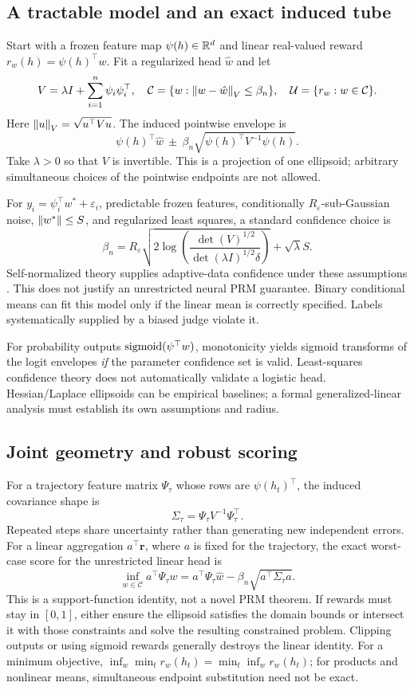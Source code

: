 \subsection{A tractable model and an exact induced tube}
Start with a frozen feature map $\psi(h)\in\mathbb{R}^d$ and linear real-valued reward
$r_w(h)=\psi(h)^\top w$. Fit a regularized head $\hat w$ and let
\[
 V=\lambda I+\sum_{i=1}^n\psi_i\psi_i^\top,
 \quad \mathcal C=\{w:\left\lVert w-\hat w\right\rVert_V\le\beta_n\},
 \quad \mathcal{U}=\{r_w:w\in\mathcal C\}.
\]
Here $\left\lVert u\right\rVert_V=\sqrt{u^\top Vu}$. The induced pointwise envelope is
\[
 \psi(h)^\top\hat w\ \pm\ \beta_n\sqrt{\psi(h)^\top V^{-1}\psi(h)}.
\]
Take $\lambda>0$ so that $V$ is invertible. This is a projection of one ellipsoid;
arbitrary simultaneous choices of the
pointwise endpoints are not allowed.

For $y_i=\psi_i^\top w^*+\varepsilon_i$, predictable frozen features,
conditionally $R_\varepsilon$-sub-Gaussian noise, $\left\lVert w^*\right\rVert\le S$, and
regularized least squares, a standard confidence choice is
\[
 \beta_n=R_\varepsilon\sqrt{2\log\left(
 \frac{\det(V)^{1/2}}{\det(\lambda I)^{1/2}\delta}\right)}+\sqrt\lambda S.
\]
Self-normalized theory supplies adaptive-data confidence under these assumptions
\cite{abbasi}. This does not justify an unrestricted neural PRM guarantee.
Binary conditional means can fit this model only if the linear mean is correctly
specified. Labels systematically supplied by a biased judge violate it.

For probability outputs $\operatorname{sigmoid}(\psi^\top w)$, monotonicity yields sigmoid
transforms of the logit envelopes \emph{if} the parameter confidence set is
valid. Least-squares confidence theory does not automatically validate a
logistic head. Hessian/Laplace ellipsoids can be empirical baselines; a formal
generalized-linear analysis must establish its own assumptions and radius.

\subsection{Joint geometry and robust scoring}
For a trajectory feature matrix $\Psi_\tau$ whose rows are $\psi(h_t)^\top$,
the induced covariance shape is
\[
 \Sigma_\tau=\Psi_\tau V^{-1}\Psi_\tau^\top.
\]
Repeated steps share uncertainty rather than generating new independent errors.
For a linear aggregation $a^\top\bm r$, where $a$ is fixed for the trajectory,
the exact worst-case score for the unrestricted linear head is
\[
 \inf_{w\in\mathcal C}a^\top\Psi_\tau w
 =a^\top\Psi_\tau\hat w-\beta_n\sqrt{a^\top\Sigma_\tau a}.
\]
This is a support-function identity, not a novel PRM theorem. If rewards must
stay in $[0,1]$, either ensure the ellipsoid satisfies the domain bounds or
intersect it with those constraints and solve the resulting constrained problem.
Clipping outputs or using sigmoid rewards generally destroys the linear identity.
For a minimum objective,
$\inf_w\min_t r_w(h_t)=\min_t\inf_w r_w(h_t)$; for products and nonlinear
means, simultaneous endpoint substitution need not be exact.

